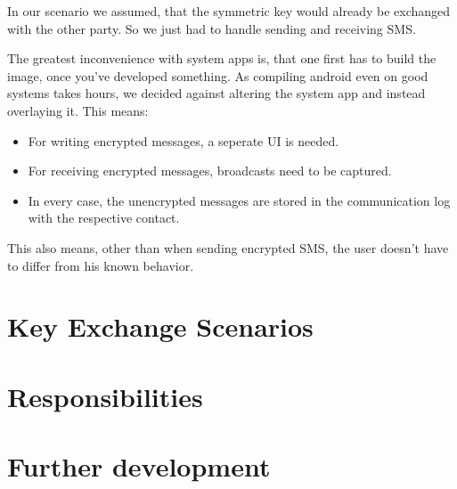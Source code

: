 \documentclass[a4paper,draft]{scrartcl}
\begin{document}
	In our scenario we assumed, that the symmetric key would already be exchanged with the other party. So we just had to handle sending and receiving SMS.
	
	The greatest inconvenience with system apps is, that one first has to build the image, once you've developed something. As compiling android even on good systems takes hours, we decided against altering the system app and instead overlaying it. This means:
	\begin{itemize}
		\item For writing encrypted messages, a seperate UI is needed.
		\item For receiving encrypted messages, broadcasts need to be captured.
		\item In every case, the unencrypted messages are stored in the communication log with the respective contact.
	\end{itemize}
	This also means, other than when sending encrypted SMS, the user doesn't have to differ from his known behavior.
	
\section{Key Exchange Scenarios}
	
\section{Responsibilities}
	
\section{Further development}
\end{document}
